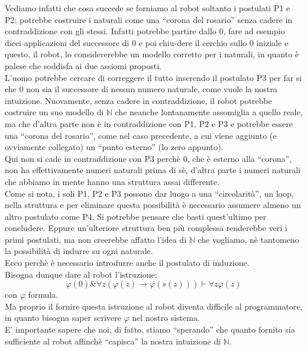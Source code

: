 Vediamo infatti che cosa succede se forniamo al robot soltanto i postulati P1 e P2: potrebbe costruire i naturali come una "`corona del rosario"' senza cadere in contraddizione con gli stessi. Infatti potrebbe partire dallo $0$, fare ad esempio dieci applicazioni del successore di $0$ e poi chiu-dere il cerchio sullo $0$ iniziale e questo, il robot, lo considererebbe un modello corretto per i naturali, in quanto \`e palese che soddisfa ai due assiomi proposti. \\ L'uomo potrebbe cercare di correggere il tutto inserendo il postulato P3 per far si che $0$ non sia il successore di nessun numero naturale, come vuole la nostra intuizione. Nuovamente, senza cadere in contraddizione, il robot potrebbe costruire un suo modello di $\mathbb{N}$ che neanche lontanamente assomiglia a quello reale, ma che d'altra parte non \`e in contraddizione con P1, P2 e P3 e potrebbe essere una "`corona del rosario"', come nel caso precedente, a cui viene aggiunto (e ovviamente collegato) un "`punto esterno"' (lo zero appunto).\\ Qui non si cade in contraddizione con P3 perch\`e $0$, che \`e esterno alla "`corona"', non ha effettivamente numeri naturali prima di s\`e, d'altra parte i numeri naturali che abbiamo in mente hanno una struttura assai differente. \\ Come si nota, i soli P1, P2 e P3 possono dar luogo a una "`circolarit\`a"', un loop, nella struttura e per eliminare questa possibilit\`a \`e necessario assumere almeno un altro postulato come P4. Si potrebbe pensare che basti quest'ultimo per concludere. Eppure un'ulteriore struttura ben pi\`u complessa renderebbe veri i primi postulati, ma non creerebbe affatto l'idea di $\mathbb{N}$ che vogliamo, n\`e tantomeno la possibilit\`a di indurre su ogni naturale. \\ Ecco perch\`e \`e necessario introdurre anche il postulato di induzione.\\
Bisogna dunque dare al robot l'istruzione: $$\varphi(0) \& \forall z (\varphi(z)\longrightarrow \varphi(s(z))) \vdash \forall z \varphi(z)$$ con $\varphi$ formula.\\
Ma proprio il fornire questa istruzione al robot diventa difficile al programmatore, in quanto bisogna saper scrivere $\varphi$ nel nostro sistema.\\
E' importante sapere che noi, di fatto, stiamo "`sperando"' che quanto fornito sia sufficiente al robot affinch\`e "`capisca"' la nostra intuizione di $\mathbb{N}.$\\ 

